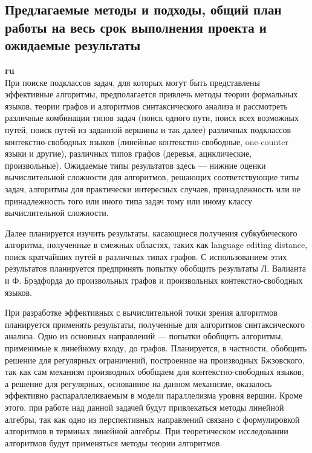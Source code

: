 \documentclass[12pt]{article}  %
\theoremstyle{remark}
\begin{document}
\subsection{Предлагаемые методы и подходы, общий план работы на весь срок выполнения проекта и ожидаемые результаты }

\textbf{ru}\\
При поиске подклассов задач, для которых могут быть представлены эффективные алгоритмы, предполагается привлечь методы теории формальных языков, теории графов и алгоритмов синтаксического анализа и рассмотреть различные комбинации типов задач (поиск одного пути, поиск всех возможных путей, поиск путей из заданной вершины и так далее) различных подклассов контекстно-свободных языков (линейные контекстно-свободные, one-counter языки и другие), различных типов графов (деревья, ациклические, произвольные). Ожидаемые типы результатов здесь — нижние оценки вычислительной сложности для алгоритмов, решающих соответствующие типы задач, алгоритмы для практически интересных случаев, принадлежность или не принадлежность того или иного типа задач тому или иному классу вычислительной сложности.

Далее планируется изучить результаты, касающиеся получения субкубического алгоритма, полученные в смежных областях, таких как language editing distance, поиск кратчайших путей в различных типах графов. С использованием этих результатов планируется предпринять попытку обобщить результаты Л. Валианта и Ф. Брэдфорда до произвольных графов и произвольных контекстно-свободных языков.

При разработке эффективных с вычислительной точки зрения алгоритмов планируется применять результаты, полученные для алгоритмов синтаксического анализа. Одно из основных направлений — попытки обобщить алгоритмы, применимые к линейному входу, до графов. Планируется, в частности, обобщить решение для регулярных ограничений, построенное на производных Бжзовского, так как сам механизм производных обобщаем для контекстно-свободных языков, а решение для регулярных, основанное на данном механизме, оказалось эффективно распараллеливаемым в модели параллелизма уровня вершин. Кроме этого, при работе над данной задачей будут привлекаться методы линейной алгебры, так как одно из перспективных направлений связано с формулировкой алгоритмов в терминах линейной алгебры. При теоретическом исследовании алгоритмов будут применяться методы теории алгоритмов.
\end{document}
